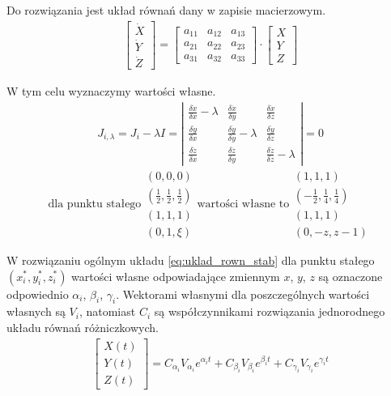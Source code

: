 Do rozwiązania jest układ równań dany w zapisie macierzowym.
\begin{align}\label{eq:uklad_rown_stab}
\left[ \begin{array}{c}
\dot{X} \\
\dot{Y} \\
\dot{Z}
\end{array}
\right] = 
\left[
\begin{array}{ccc}
a_{11} & a_{12} & a_{13} \\
a_{21} & a_{22} & a_{23} \\
a_{31} & a_{32} & a_{33}
\end{array}
\right] \cdot 
\left[
\begin{array}{c}
X\\
Y\\
Z
\end{array}
\right]
\end{align}

W tym celu wyznaczymy wartości własne.
\begin{align}
J_{i,\lambda} = J_i - \lambda I = 
\left|
\begin{array}{ccc}
\frac{\delta \dot{x}}{\delta x}-\lambda & \frac{\delta \dot{x}}{\delta y} & \frac{\delta \dot{x}}{\delta z} \\
\frac{\delta \dot{y}}{\delta x} & \frac{\delta \dot{y}}{\delta y}-\lambda & \frac{\delta \dot{y}}{\delta z} \\
\frac{\delta \dot{z}}{\delta x} & \frac{\delta \dot{z}}{\delta y} & \frac{\delta \dot{z}}{\delta z}-\lambda
\end{array}
\right| = 0
\end{align}
\begin{equation*}
\text{dla punktu stałego}
\begin{array}{c}
(0,0,0) \\
(\frac{1}{2},\frac{1}{2},\frac{1}{2}) \\
(1,1,1) \\
(0,1,\xi)
\end{array}
\text{wartości własne to}
\begin{array}{c}
(1,1,1)\\
(-\frac{1}{2}, \frac{1}{4}, \frac{1}{4})\\
(1,1,1)\\
(0,-z, z-1)
\end{array}
\end{equation*}

W rozwiązaniu ogólnym układu \ref{eq:uklad_rown_stab} dla punktu stałego $(x^*_i, y^*_i, z^*_i)$ wartości własne odpowiadające zmiennym $x$, $y$, $z$ są oznaczone odpowiednio $\alpha_i$, $\beta_i$, $\gamma_i$. Wektorami własnymi dla poszczególnych wartości własnych są $V_i$, natomiast $C_i$ są współczynnikami rozwiązania jednorodnego układu równań różniczkowych. 
\begin{align}\label{eq:rozw_ur}
\left[ \begin{array}{c}
X(t)\\
Y(t)\\
Z(t)
\end{array}
\right] = C_{\alpha_i} V_{\alpha_i} e^{\alpha_it} + C_{\beta_i} V_{\beta_i} e^{\beta_it} + C_{\gamma_i} V_{\gamma_i} e^{\gamma_it}
\end{align}

